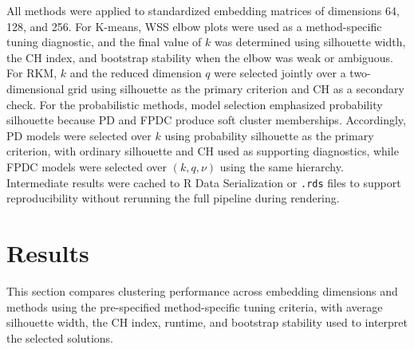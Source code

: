 \documentclass[
  11pt,
  letterpaper,
  DIV=11,
  numbers=noendperiod]{scrartcl}
\begin{document}
All methods were applied to standardized embedding matrices of
dimensions 64, 128, and 256. For K-means, WSS elbow plots were used as a
method-specific tuning diagnostic, and the final value of \(k\) was
determined using silhouette width, the CH index, and bootstrap stability
when the elbow was weak or ambiguous. For RKM, \(k\) and the reduced
dimension \(q\) were selected jointly over a two-dimensional grid using
silhouette as the primary criterion and CH as a secondary check. For the
probabilistic methods, model selection emphasized probability silhouette
because PD and FPDC produce soft cluster memberships. Accordingly, PD
models were selected over \(k\) using probability silhouette as the
primary criterion, with ordinary silhouette and CH used as supporting
diagnostics, while FPDC models were selected over \((k, q, \nu)\) using
the same hierarchy. Intermediate results were cached to R Data
Serialization or \texttt{.rds} files to support reproducibility without
rerunning the full pipeline during rendering.

\section{Results}\label{sec-results}

This section compares clustering performance across embedding dimensions
and methods using the pre-specified method-specific tuning criteria,
with average silhouette width, the CH index, runtime, and bootstrap
stability used to interpret the selected solutions.
\end{document}
